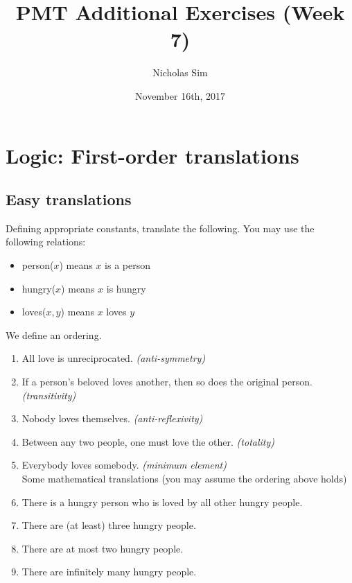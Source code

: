 \documentclass[10pt,a4paper]{article}
\begin{document}
\title{PMT Additional Exercises (Week 7)}
\author{Nicholas Sim}
\date{November 16th, 2017}
\maketitle{}



\section{Logic: First-order translations}
\subsection{Easy translations}
Defining appropriate constants, translate the following. You may use the following relations:

\begin{itemize}
    \item person(\(x\)) means \(x\) is a person
    \item hungry(\(x\)) means \(x\) is hungry
    \item loves(\(x, y\)) means \(x\) loves \(y\)
\end{itemize}

We define an ordering.
\begin{enumerate}
    \item All love is unreciprocated. \emph{(anti-symmetry)}
    \item If a person's beloved loves another, then so does the original person. \emph{(transitivity)}
    \item Nobody loves themselves. \emph{(anti-reflexivity)}
    \item Between any two people, one must love the other. \emph{(totality)}
    \item Everybody loves somebody. \emph{(minimum element)} \\

    Some mathematical translations (you may assume the ordering above holds)
    \item There is a hungry person who is loved by all other hungry people.

    \item There are (at least) three hungry people.

    \item There are at most two hungry people.

    \item There are infinitely many hungry people.
\end{enumerate}
\end{document}
